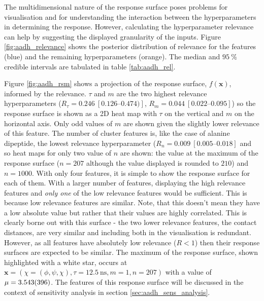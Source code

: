 The multidimensional nature of the response surface poses problems for visualisation and for understanding the interaction between the hyperparameters in determining the response. However, calculating the hyperparameter relevance can help by suggesting the displayed granularity of the inputs. Figure \ref{fig:aadh_relevance} shows the posterior distribution of relevance for the features (blue) and the remaining hyperparameters (orange). The median and $\SI{95}{\percent}$ credible intervals are tabulated in table \ref{tab:aadh_rel}. 

Figure \ref{fig:aadh_rsm} shows a projection of the response surface, $f(\mathbf{x})$, informed by the relevance. $\tau$ and $m$ are the two highest relevance hyperparameters ($R_{\tau} = \num{0.246}\ [\numrange[range-phrase=--]{0.126}{0.474})]$, $R_{m} = \num{0.044}\ [\numrange[range-phrase=--]{0.022}{0.095}]$) so the response surface is shown as a 2D heat map with $\tau$ on the vertical and $m$ on the horizontal axis. Only odd values of $m$ are shown given the slightly lower relevance of this feature. The number of cluster features is, like the case of alanine dipeptide, the lowest relevance hyperparameter ($R_{n} = \num{0.009}\ [\numrange[range-phrase=--]{0.005}{0.018}]$ and so heat maps for only two value of $n$ are shown: the value at the maximum of the response surface ($n=207$ although the value displayed is rounded to $210$) and $n=1000$. With only four features, it is  simple to show the response surface for each of them. With a larger number of features, displaying the high relevance features and \emph{only one} of the low relevance features would be sufficient. This is because low relevance features are similar.  Note, that this doesn't mean they have a low absolute value but rather that their values are highly correlated. This is clearly borne out with this surface - the two lower relevance features, the contact distances, are very similar and including both in the visualisation is redundant. However, as all features have absolutely low relevance ($R<1$) then their response surfaces are expected to be similar. The maximum of the response surface, shown highlighted with a  white star, occurs at $\mathbf{x}=\left(\chi=(\phi, \psi, \chi), \tau = \SI{12.5}{\nano\second}, m=1, n=207\right)$ with a value of $\mu=\num{3.543 \pm 0.396}$. The features of this response surface will be discussed in the context of sensitivity analysis in section \ref{sec:aadh_sens_analysis}. 

